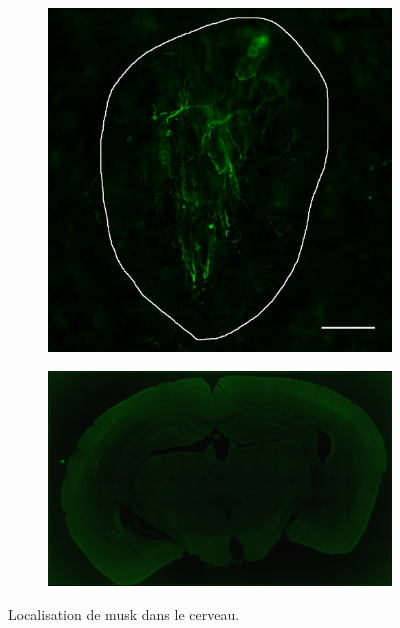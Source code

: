 \begin{figure}[h]
\begin{subfigure}[h]{0.245\textwidth}
		\end{subfigure}
		\begin{subfigure}[h]{0.245\textwidth}
			\caption{}
			\label{fig:locaMuSKfr}
			\includegraphics[width=\textwidth]{./Images/Immuno/Musk/MuSK_fr_50um.jpg}
		\end{subfigure}
		\begin{subfigure}[h]{0.395\textwidth}
			\caption{}
			\label{fig:locaMusKCtrl}
			\includegraphics[width=\textwidth]{./Images/Immuno/Musk/loca_MuSK_ctrl.jpg}
		\end{subfigure}
		\caption{Localisation de \gls{musk} dans le cerveau.}

\end{figure}
